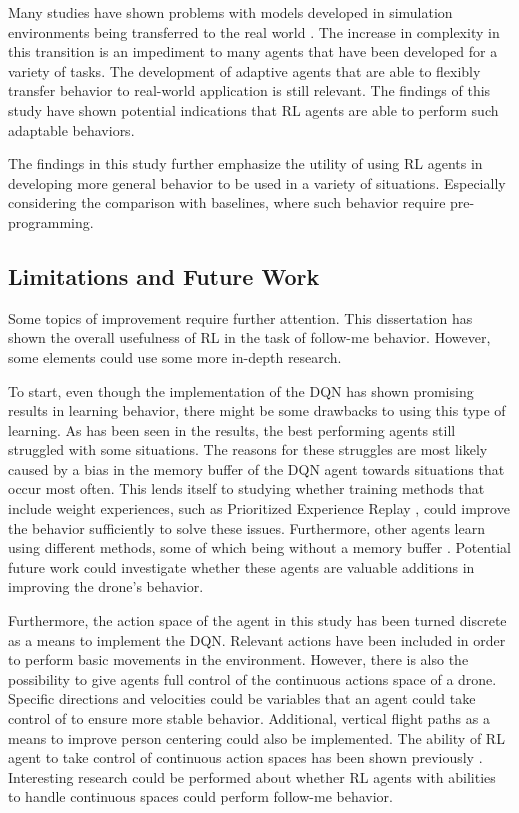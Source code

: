 Many studies have shown problems with 
models developed in simulation environments being transferred to the real world \cite{DroneRLUsingTransferLearning, RLenLSTMfordrone}. 
The increase in complexity in this transition is an impediment to many agents that 
have been developed for a variety of tasks. The development of adaptive agents that 
are able to flexibly transfer behavior to real-world application is still relevant. 
The findings of this study have shown potential indications that RL agents are 
able to perform such adaptable behaviors. 

The findings in this study further emphasize the 
utility of using RL agents in developing more general behavior to be used in 
a variety of situations. Especially considering the comparison with baselines, 
where such behavior require pre-programming. 


\subsection{Limitations and Future Work}
Some topics of improvement require further attention. This dissertation has 
shown the overall usefulness of RL in the task of follow-me behavior. However, 
some elements could use some more in-depth research. 

To start, even though the implementation of the DQN has shown promising results 
in learning behavior, there might be some drawbacks to using this type of learning. 
As has been seen in the results, the best performing agents still struggled with 
some situations. The reasons for these struggles are most likely caused by a bias in 
the memory buffer of the DQN agent towards situations that occur most often. 
This lends itself to studying whether training methods that include weight experiences, 
such as Prioritized Experience Replay \cite{prioritizedreplay}, could improve 
the behavior sufficiently to solve these issues. Furthermore, other agents learn 
using different methods, some of which being without a memory buffer \cite{A3C, PPO,SAC}. 
Potential future work could investigate whether these agents are valuable additions 
in improving the drone's behavior. 

Furthermore, the action space of the agent in this study has been turned discrete 
as a means to implement the DQN. Relevant actions have been included in order to 
perform basic movements in the environment. However, there is also the possibility 
to give agents full control of the continuous actions space of a drone. Specific 
directions and velocities could be variables that an agent could take control of 
to ensure more stable behavior. Additional, vertical flight paths as a means to improve 
person centering could also be implemented. The ability of RL agent to take control of 
continuous action spaces has been shown previously \cite{FrontalViewRL, AirSimDroneNavigation}. 
Interesting research could be performed about whether RL agents with abilities to 
handle continuous spaces \cite{A3C, PPO, SAC, DDPG} could perform follow-me behavior. 

